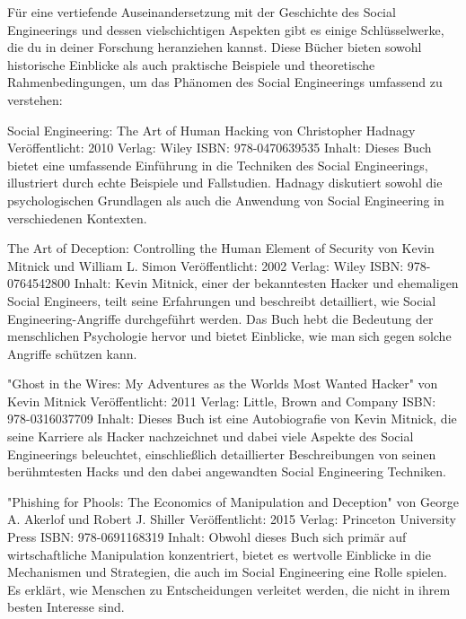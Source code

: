 Für eine vertiefende Auseinandersetzung mit der Geschichte des Social Engineerings und dessen vielschichtigen Aspekten gibt es einige Schlüsselwerke, die du in deiner Forschung heranziehen kannst. Diese Bücher bieten sowohl historische Einblicke als auch praktische Beispiele und theoretische Rahmenbedingungen, um das Phänomen des Social Engineerings umfassend zu verstehen:

Social Engineering: The Art of Human Hacking von Christopher Hadnagy
Veröffentlicht: 2010
Verlag: Wiley
ISBN: 978-0470639535
Inhalt: Dieses Buch bietet eine umfassende Einführung in die Techniken des Social Engineerings, illustriert durch echte Beispiele und Fallstudien. Hadnagy diskutiert sowohl die psychologischen Grundlagen als auch die Anwendung von Social Engineering in verschiedenen Kontexten.


The Art of Deception: Controlling the Human Element of Security von Kevin Mitnick und William L. Simon
Veröffentlicht: 2002
Verlag: Wiley
ISBN: 978-0764542800
Inhalt: Kevin Mitnick, einer der bekanntesten Hacker und ehemaligen Social Engineers, teilt seine Erfahrungen und beschreibt detailliert, wie Social Engineering-Angriffe durchgeführt werden. Das Buch hebt die Bedeutung der menschlichen Psychologie hervor und bietet Einblicke, wie man sich gegen solche Angriffe schützen kann.


"Ghost in the Wires: My Adventures as the Worlds Most Wanted Hacker" von Kevin Mitnick
Veröffentlicht: 2011
Verlag: Little, Brown and Company
ISBN: 978-0316037709
Inhalt: Dieses Buch ist eine Autobiografie von Kevin Mitnick, die seine Karriere als Hacker nachzeichnet und dabei viele Aspekte des Social Engineerings beleuchtet, einschließlich detaillierter Beschreibungen von seinen berühmtesten Hacks und den dabei angewandten Social Engineering Techniken.

"Phishing for Phools: The Economics of Manipulation and Deception" von George A. Akerlof und Robert J. Shiller
Veröffentlicht: 2015
Verlag: Princeton University Press
ISBN: 978-0691168319
Inhalt: Obwohl dieses Buch sich primär auf wirtschaftliche Manipulation konzentriert, bietet es wertvolle Einblicke in die Mechanismen und Strategien, die auch im Social Engineering eine Rolle spielen. Es erklärt, wie Menschen zu Entscheidungen verleitet werden, die nicht in ihrem besten Interesse sind.

